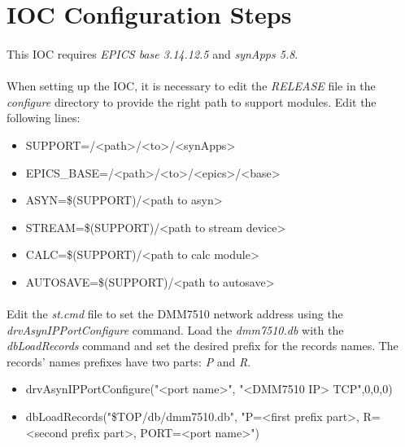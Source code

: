 \documentclass[openany]{article}
\begin{document}
\section{IOC Configuration Steps}

	\paragraph{} This IOC requires \emph{EPICS base 3.14.12.5} and \emph{synApps 5.8}.

	\paragraph{} When setting up the IOC, it is necessary to edit the \emph{RELEASE} file in the \emph{configure} directory to provide the right path to support modules. Edit the following lines:

	\begin{itemize}
		\item[] SUPPORT=/\textless path\textgreater/\textless to\textgreater/\textless synApps\textgreater
		\item[] EPICS\_BASE=/\textless path\textgreater/\textless to\textgreater/\textless epics\textgreater/\textless base\textgreater
		\item[] ASYN=\$(SUPPORT)/\textless path to asyn\textgreater
		\item[] STREAM=\$(SUPPORT)/\textless path to stream device\textgreater
		\item[] CALC=\$(SUPPORT)/\textless path to calc module\textgreater
		\item[] AUTOSAVE=\$(SUPPORT)/\textless path to autosave\textgreater
	\end{itemize}

	\paragraph{} Edit the \emph{st.cmd} file to set the DMM7510 network address using the \emph{drvAsynIPPortConfigure} command. Load the \emph{dmm7510.db} with the \emph{dbLoadRecords} command and set the desired prefix for the records names. The records' names prefixes have two parts: \emph{P} and \emph{R}.

	\begin{itemize}
		\item[] drvAsynIPPortConfigure("\textless port name\textgreater", "\textless DMM7510 IP{\textgreater} TCP",0,0,0)
		\item[] dbLoadRecords("\${TOP}/db/dmm7510.db", "P=\textless first prefix part\textgreater, R=\textless second prefix part\textgreater, PORT=\textless port name\textgreater")
	\end{itemize}
\end{document}

